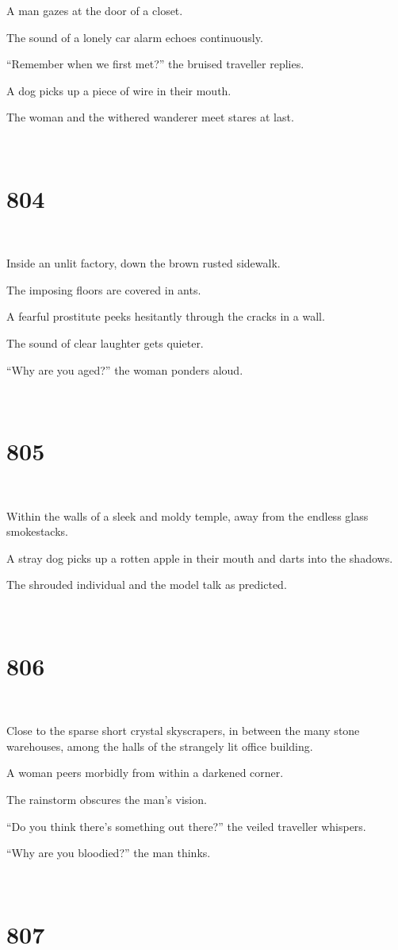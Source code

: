 \documentclass{report}
\begin{document}
A man gazes at the door of a closet.

The sound of a lonely car alarm echoes continuously.

``Remember when we first met?'' the bruised traveller replies.

A dog picks up a piece of wire in their mouth.

The woman and the withered wanderer meet stares at last.

~
\chapter*{804}
~

Inside an unlit factory, down the brown rusted sidewalk.

The imposing floors are covered in ants.

A fearful prostitute peeks hesitantly through the cracks in a wall.

The sound of clear laughter gets quieter.

``Why are you aged?'' the woman ponders aloud.

~
\chapter*{805}
~

Within the walls of a sleek and moldy temple, away from the endless glass smokestacks.

A stray dog picks up a rotten apple in their mouth and darts into the shadows.

The shrouded individual and the model talk as predicted.

~
\chapter*{806}
~

Close to the sparse short crystal skyscrapers, in between the many stone warehouses, among the halls of the strangely lit office building.

A woman peers morbidly from within a darkened corner.

The rainstorm obscures the man's vision.

``Do you think there's something out there?'' the veiled traveller whispers.

``Why are you bloodied?'' the man thinks.

~
\chapter*{807}
~
\end{document}
